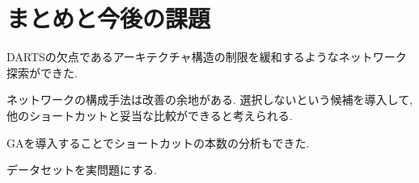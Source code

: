 \documentclass[twocolumn]{jarticle}     %
\begin{document}
\section{まとめと今後の課題}
DARTSの欠点であるアーキテクチャ構造の制限を緩和するようなネットワーク探索ができた.

ネットワークの構成手法は改善の余地がある.
選択しないという候補を導入して, 他のショートカットと妥当な比較ができると考えられる.

GAを導入することでショートカットの本数の分析もできた.

データセットを実問題にする.



\end{document}

